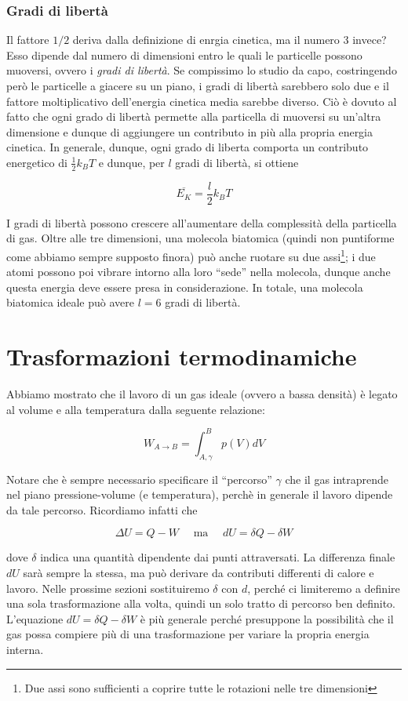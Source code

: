 \subsubsection*{Gradi di libertà}
Il fattore $1/2$ deriva dalla definizione di enrgia cinetica, ma
il numero $3$ invece? Esso dipende dal numero di dimensioni entro
le quali le particelle possono muoversi, ovvero i \textit{gradi di
libertà}. Se compissimo lo studio da capo, costringendo però le particelle
a giacere su un piano, i gradi di libertà sarebbero solo due e il fattore
moltiplicativo
dell'energia cinetica media sarebbe diverso. Ciò è dovuto al fatto
che ogni grado di libertà permette alla particella di muoversi su
un'altra dimensione e dunque di aggiungere un contributo in più alla
propria energia cinetica. In generale, dunque, ogni grado di
liberta comporta un contributo energetico di $\frac12k_BT$ e
dunque, per $l$ gradi di libertà, si ottiene

\[ \overline{E_K} = \frac{l}{2}k_BT \]

I gradi di libertà possono crescere all'aumentare della complessità
della particella di gas. Oltre alle tre dimensioni, una molecola
biatomica (quindi non puntiforme come abbiamo sempre supposto finora)
può anche ruotare su due assi\footnote{Due assi sono sufficienti a
coprire tutte le rotazioni nelle tre dimensioni}; i due atomi possono
poi vibrare intorno alla loro ``sede'' nella molecola, dunque anche
questa energia deve essere presa in considerazione. In totale, una
molecola biatomica ideale può avere $l = 6$ gradi di libertà.


\section*{Trasformazioni termodinamiche}
Abbiamo mostrato che il lavoro di un gas ideale (ovvero a bassa densità)
è legato al volume e alla temperatura dalla seguente relazione:

\[ W_{A\to B} = \int_{A,\gamma}^{B}p(V)dV \]

\noindent Notare che è sempre necessario specificare il ``percorso'' $\gamma$
che il gas intraprende nel piano pressione-volume (e temperatura),
perchè in generale il lavoro dipende da tale percorso. Ricordiamo
infatti che

\[ \Delta U = Q - W \quad\text{ ma }\quad dU = \delta Q - \delta W \]

\noindent dove $\delta$ indica una quantità dipendente dai punti attraversati.
La differenza finale $dU$ sarà sempre la stessa, ma può derivare
da contributi differenti di calore e lavoro. Nelle prossime sezioni
sostituiremo $\delta$ con $d$, perché ci limiteremo a definire una
sola trasformazione alla volta, quindi un solo tratto di percorso
ben definito. L'equazione $dU = \delta Q - \delta W$ è più generale
perché presuppone la possibilità che il gas possa compiere più di una
trasformazione per variare la propria energia interna.

